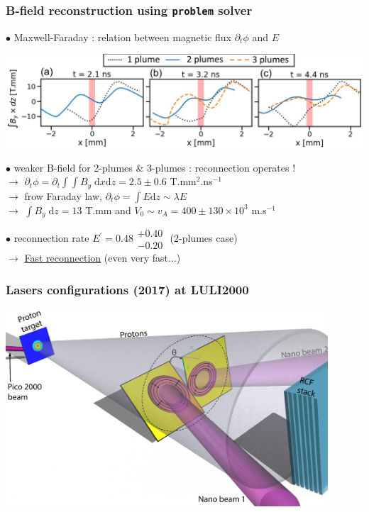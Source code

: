 \documentclass{beamer}
\newcommand{\D}{{\mathrm d}}
\begin{document}
\begin{frame}
\frametitle{B-field reconstruction using \texttt{problem} solver}

$\bullet$ Maxwell-Faraday : relation between magnetic flux $\partial_t \phi$ and $E$ \\

\begin{center}
\includegraphics[width=1.0\textwidth]{problem.png}
\end{center}

$\bullet$ weaker B-field for 2-plumes \& 3-plumes : reconnection operates ! \\
$\to$ $\partial_t \phi = \partial_t \int \!\!\! \int B_y \; \D x \D z = 2.5 \pm 0.6$ T.mm$^2$.ns$^{-1}$ \\
$\to$ frow Faraday law, $\partial_t \phi = \int E \D z \sim \lambda E$ \\
$\to$ $\int B_y \; \D z = 13$ T.mm and $V_0 \sim v_A = 400 \pm 130 \times 10^3$ m.s$^{-1}$ \\

\bigskip

$\bullet$ reconnection rate $E^{\prime} = 0.48 \substack{+0.40 \\ -0.20}$ (2-plumes case) \\
$\to$ \underline{Fast reconnection} (even very fast...) \\

\end{frame}



\begin{frame}
\frametitle{Lasers configurations (2017) at LULI2000}

\begin{center}
\includegraphics[width=0.9\textwidth]{manip.png}
\end{center}

\end{frame}
\end{document}
